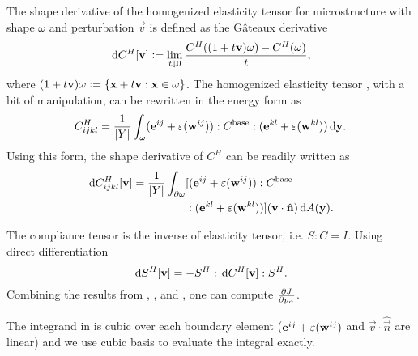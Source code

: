 \documentclass[twocolumn,10pt]{article}
\begin{document}
 The shape derivative of
the homogenized elasticity tensor for microstructure with shape
$\omega$ and perturbation $\vec{v}$ is defined as the G\^ateaux
derivative \cite{zolesio2001shapes}
\begin{equation}
  \, \mathrm{d} C^H[\mathbf v] \vcentcolon= \lim_{t\downarrow 0} \frac{C^H((1+t\mathbf v)\omega)-C^H(\omega)}{t},
\end{equation}
where $(1+t\mathbf v)\omega \vcentcolon= \{\mathbf x+t\mathbf v : \mathbf x \in \omega\}$. The
homogenized elasticity tensor , with a bit of
manipulation, can be rewritten in the energy form as
\begin{equation}
  \label{eqn:EhEnergy}
  C^H_{ijkl} = \frac{1}{|Y|} \int_\omega (\mathbf e^{ij} +
  \varepsilon(\mathbf w^{ij})) : C^\text{base} : (\mathbf e^{kl} +
  \varepsilon(\mathbf w^{kl})) \, \mathrm{d} \mathbf y.
\end{equation}
Using this form, the shape derivative of $C^H$ can be readily written as
\begin{align}
  \label{eqn:elastShapeDer}
  \, \mathrm{d} C^H_{ijkl}[\mathbf v] =
  \frac{1}{|Y|} \int_{\partial \omega} &[(\mathbf e^{ij} + \varepsilon(\mathbf w^{ij})) : C^\text{base}\\
    &: (\mathbf e^{kl} + \varepsilon(\mathbf w^{kl}))] (\mathbf v \cdot \hat{\mathbf n}) \, \mathrm{d}A(\mathbf y).\notag
\end{align}

 The compliance tensor is
the inverse of elasticity tensor, i.e. $S:C=I$. Using direct
differentiation
\begin{equation}
  \label{eqn:compShapeDer}
  \, \mathrm{d} S^H[\mathbf v] = -S^H : \, \mathrm{d} C^H[\mathbf v] : S^H.
\end{equation}
Combining the results from ,
, and , one can compute $\frac{\partial J}{\partial p_\alpha}$.

 The integrand in  is
cubic over each boundary element ($\mathbf e^{ij} +
\varepsilon(\mathbf w^{ij})$ and $\vec{v}\cdot\hat{\vec{n}}$ are linear) and
we use cubic basis to evaluate the integral exactly.



\end{document}
